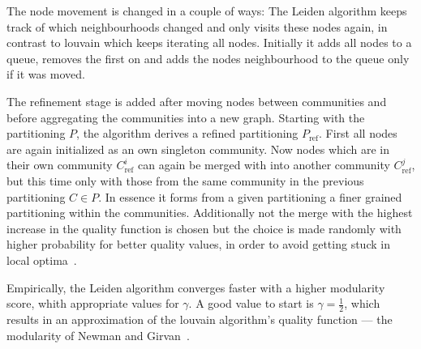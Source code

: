                 The node movement is changed in a couple of ways: 
                The Leiden algorithm keeps track of which neighbourhoods changed and only visits these nodes again, in contrast to louvain which keeps iterating all nodes\autocite{movb, movc}.
                Initially it adds all nodes to a queue, removes the first on and adds the nodes neighbourhood to the queue only if it was moved.
                
                The refinement stage is added after moving nodes between communities and before aggregating the communities into a new graph.
                Starting with the partitioning $P$, the algorithm derives a refined partitioning $P_{\text{ref}}$.
                First all nodes are again initialized as an own singleton community. 
                Now nodes which are in their own community $C^i_{\text{ref}}$ can again be merged with into another community $C^j_{\text{ref}}$, but this time only with those from the same community in the previous partitioning $C \in P$. 
                In essence it forms from a given partitioning a finer grained partitioning within the communities.
                Additionally not the merge with the highest increase in the quality function is chosen but the choice is made randomly with higher probability for better quality values, in order to avoid getting stuck in local optima~\autocite{mova}.
                
                Empirically, the Leiden algorithm converges faster with a higher modularity score, whith appropriate values for $\gamma$. A good value to start is $\gamma = \frac{1}{2}$, which results in an approximation of the louvain algorithm's quality function --- the modularity of Newman and Girvan~\autocite{girvan2002community}.
                
            

 

